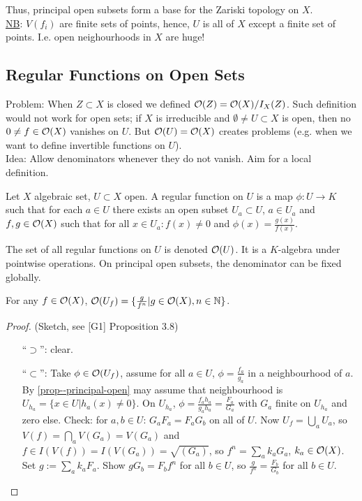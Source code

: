 \documentclass[a4paper,11pt]{article}
\begin{document}
			Thus, principal open subsets form a base for the Zariski topology on $X$.
			\\

			\noindent\underline{NB}: $V(f_i)$ are finite sets of points, hence, $U$ is all of $X$ except a finite set of points. I.e. open neighourhoods in $X$ are huge!
			

		\subsection{Regular Functions on Open Sets}

			Problem: When $Z\subset X$ is closed we defined $\mathcal{O}(Z)=\mathcal{O}(X)/I_X(Z)$. Such definition would not work for open sets; if $X$ is irreducible and $\emptyset\neq U\subset X$ is open, then no $0\neq f\in\mathcal{O}(X)$ vanishes on $U$. But $\mathcal{O}(U)=\mathcal{O}(X)$ creates problems (e.g. when we want to define invertible functions on $U$).
			\\

			Idea: Allow denominators whenever they do not vanish. Aim for a local definition.

			\begin{defi}
				Let $X$ algebraic set, $U\subset X$ open. A regular function on $U$ is a map $\phi:U\rightarrow K$ such that for each $a\in U$ there exists an open subset $U_a\subset U$, $a\in U_a$ and $f,g\in\mathcal{O}(X)$ such that for all $x\in U_a: f(x)\neq0$ and $\phi(x)=\frac{g(x)}{f(x)}$.
			\end{defi}

			The set of all regular functions on $U$ is denoted $\mathcal{O}(U)$. It is a $K$-algebra under pointwise operations. On principal open subsets, the denominator can be fixed globally.

			\begin{prop}\label{prop--regular-functions}
				For any $f\in\mathcal{O}(X)$, $\mathcal{O}(U_f)=\{\frac{g}{f^n}|g\in\mathcal{O}(X),n\in\mathbb{N}\}$.
			\end{prop}
			\begin{proof}
				(Sketch, see [G1] Proposition 3.8) \begin{enumerate}
					\item[``$\supset$'':] clear.
					\item[``$\subset$'':] Take $\phi\in\mathcal{O}(U_f)$, assume for all $a\in U$, $\phi=\frac{f_a}{g_a}$ in a neighbourhood of $a$. By \autoref{prop--principal-open} may assume that neighbourhood is $U_{h_a}=\{x\in U|h_a(x)\neq0\}$. On $U_{h_a}$, $\phi=\frac{f_ah_a}{g_ah_a}=\frac{F_a}{G_a}$ with $G_a$ finite on $U_{h_a}$ and zero else. Check: for $a,b\in U$: $G_aF_a=F_aG_b$ on all of $U$. Now $U_f=\bigcup_aU_a$, so $V(f)=\bigcap_aV(G_a)=V(G_a)$ and $f\in I(V(f))=I(V(G_a))=\sqrt{(G_a)}$, so $f^n=\sum_ak_aG_a$, $k_a\in\mathcal{O}(X)$. Set $g:=\sum_ak_aF_a$. Show $gG_b=F_bf^n$ for all $b\in U$, so $\frac{g}{f^n}=\frac{F_b}{G_b}$ for all $b\in U$.
				\end{enumerate}
			\end{proof}
\end{document}
